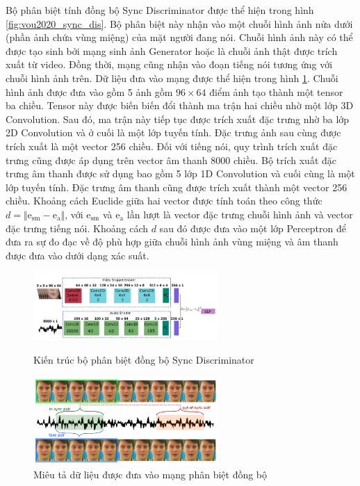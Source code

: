 Bộ phân biệt tính đồng bộ Sync Discriminator được thể hiện trong hình \ref{fig:vou2020_sync_dis}. Bộ phân biệt này nhận vào một chuỗi hình ảnh nửa dưới (phần ảnh chứa vùng miệng) của mặt người đang nói. Chuỗi hình ảnh này có thể được tạo sinh bởi mạng sinh ảnh Generator hoặc là chuỗi ảnh thật được trích xuất từ video. Đồng thời, mạng cũng nhận vào đoạn tiếng nói tương ứng với chuỗi hình ảnh trên. Dữ liệu đưa vào mạng được thể hiện trong hình \ref{fig:vou2020_sync_input}. Chuỗi hình ảnh được đưa vào gồm 5 ảnh gồm $96 \times 64$ điểm ảnh tạo thành một tensor ba chiều. Tensor này được biến biến đổi thành ma trận hai chiều nhờ một lớp 3D Convolution. Sau đó, ma trận này tiếp tục được trích xuất đặc trưng nhờ ba lớp 2D Convolution và ở cuối là một lớp tuyến tính. Đặc trưng ảnh sau cùng được trích xuất là một vector 256 chiều. Đối với tiếng nói, quy trình trích xuất đặc trưng cũng được áp dụng trên vector âm thanh 8000 chiều. Bộ trích xuất đặc trưng âm thanh được sử dụng bao gồm 5 lớp 1D Convolution và cuối cùng là một lớp tuyến tính. Đặc trưng âm thanh cũng được trích xuất thành một vector 256 chiều. Khoảng cách Euclide giữa hai vector được tính toán theo công thức $d = \Vert \textrm{e}_{\textrm{sm}} - \textrm{e}_{\textrm{a}} \Vert$, với $\textrm{e}_{\textrm{sm}}$ và $\textrm{e}_{\textrm{a}}$ lần lượt là vector đặc trưng chuỗi hình ảnh và vector đặc trưng tiếng nói. Khoảng cách $d$ sau đó được đưa vào một lớp Perceptron để đưa ra sự đo đạc về độ phù hợp giữa chuỗi hình ảnh vùng miệng và âm thanh được đưa vào dưới dạng xác suất.

\begin{figure}[H]
    \centering
    \begin{minipage}{0.48\textwidth}
        \includegraphics[width=7cm]{./content/images/vou2020_sync_dis.png}
        \caption{Kiến trúc bộ phân biệt đồng bộ Sync Discriminator}
        \label{fig:vou2020_sync_dis}
    \end{minipage}\hfill
    \begin{minipage}{0.48\textwidth}
        \includegraphics[width=7cm]{./content/images/vou2020_sync_input.png}
        \caption{Miêu tả dữ liệu được đưa vào mạng phân biệt đồng bộ}
        \label{fig:vou2020_sync_input}
    \end{minipage}
\end{figure}

